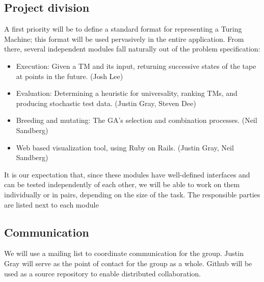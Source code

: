\subsection{Project division}

A first priority will be to define a standard format for representing a Turing Machine; this format will be used pervasively in the entire application. From there, several independent modules fall naturally out of the problem specification:

\begin{itemize}
\item Execution: Given a TM and its input, returning successive states of the tape at points in the future. (Josh Lee)
\item Evaluation: Determining a heuristic for universality, ranking TMs, and producing stochastic test data. (Justin Gray, Steven Dee)
\item Breeding and mutating: The GA's selection and combination processes. (Neil Sandberg)
\item Web based visualization tool, using Ruby on Rails. (Justin Gray, Neil Sandberg)
\end{itemize}

It is our expectation that, since these modules have well-defined interfaces and can be tested independently of each other, we will be able to work on them individually or in pairs, depending on the size of the task. The responsible parties are listed next to each module

\subsection{Communication}

We will use a mailing list to coordinate communication for the group. Justin Gray will serve as the point of contact for the group as a whole. Github will be used as a source repository to enable distributed collaboration.